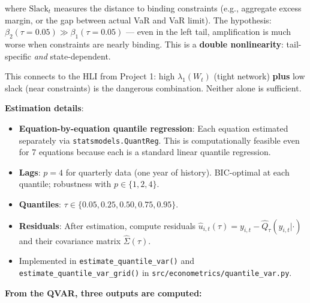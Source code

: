 \documentclass[11pt,a4paper]{article}
\begin{document}
where $\text{Slack}_t$ measures the distance to binding constraints (e.g., aggregate excess margin, or the gap between actual VaR and VaR limit). The hypothesis: $\beta_2(\tau = 0.05) \gg \beta_1(\tau = 0.05)$ --- even in the left tail, amplification is much worse when constraints are nearly binding. This is a \textbf{double nonlinearity}: tail-specific \textit{and} state-dependent.

This connects to the HLI from Project 1: high $\lambda_1(W_t)$ (tight network) \textbf{plus} low slack (near constraints) is the dangerous combination. Neither alone is sufficient.

\textbf{Estimation details}:
\begin{itemize}
\item \textbf{Equation-by-equation quantile regression}: Each equation estimated separately via \texttt{statsmodels.QuantReg}. This is computationally feasible even for 7 equations because each is a standard linear quantile regression.
\item \textbf{Lags}: $p = 4$ for quarterly data (one year of history). BIC-optimal at each quantile; robustness with $p \in \{1, 2, 4\}$.
\item \textbf{Quantiles}: $\tau \in \{0.05, 0.25, 0.50, 0.75, 0.95\}$.
\item \textbf{Residuals}: After estimation, compute residuals $\hat{u}_{i,t}(\tau) = y_{i,t} - \hat{Q}_\tau(y_{i,t}|\cdot)$ and their covariance matrix $\hat{\Sigma}(\tau)$.
\item Implemented in \texttt{estimate\_quantile\_var()} and \texttt{estimate\_quantile\_var\_grid()} in \texttt{src/econometrics/quantile\_var.py}.

\end{itemize}
\textbf{From the QVAR, three outputs are computed:}
\end{document}
